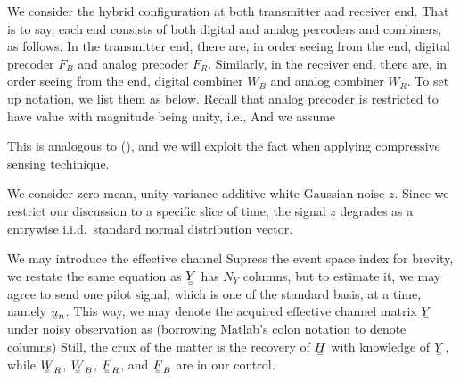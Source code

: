We consider the hybrid configuration at both transmitter and receiver end.
That is to say, each end consists of both digital and analog percoders and combiners, as follows.
In the transmitter end, there are, in order seeing from the end, digital precoder \(F_B\) and analog precoder \(F_R\).
Similarly, in the receiver end, there are, in order seeing from the end, digital combiner \(W_B\) and analog combiner \(W_R\).
To set up notation, we list them as below.
%
%
Recall that analog precoder is restricted to have value with magnitude being unity, i.e.,
%
%
And we assume

This is analogous to (), and we will exploit the fact when applying compressive sensing techinique.

We consider zero-mean, unity-variance additive white Gaussian noise \(z\).
Since we restrict our discussion to a specific slice of time, the signal \(z\) degrades as a entrywise i.i.d.\ standard normal distribution vector.

We may introduce the effective channel
%
%
Supress the event space index for brevity, we restate the same equation as
%
\(\M{Y}\) has \(N_Y\) columns, but to estimate it, we may agree to send one pilot signal, which is one of the standard basis, at a time, namely \(\V{u}_n\).
This way, we may denote the acquired effective channel matrix \(\M{Y}\) under noisy observation as (borrowing Matlab's colon notation to denote columns)
%
%
Still, the crux of the matter is the recovery of \(\M{H}\) with knowledge of \(\M{Y}\), while \(\M{W}_R\), \(\M{W}_B\), \(\M{F}_R\), and \(\M{F}_B\) are in our control.

